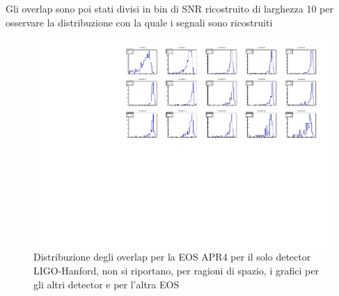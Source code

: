 Gli overlap sono poi stati divisi in bin di SNR ricostruito di larghezza 10 per osservare la distribuzione con la quale i segnali sono ricostruiti 
\begin{figure}[H]
	\vspace{-10pt}
	\centering
	\includegraphics[width=1\textwidth]{figures/Capitolo_4/OverlapDistributionsDetector1APR4_q09_CUT_1.pdf}
	\vspace{-15pt}
	\caption{Distribuzione degli overlap per la EOS APR4 per il solo detector LIGO-Hanford, non si riportano, per ragioni di spazio, i grafici per gli altri detector e per l'altra EOS}
	\label{fig:Distributions_overlap}
	\vspace{-15pt}
\end{figure}
